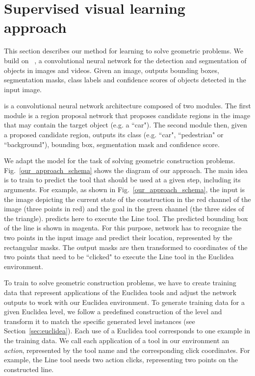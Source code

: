 \section{Supervised visual learning approach}
\label{mrcnn_section}
This section describes our method for learning to solve geometric problems.
We build on \maskrcnn~\cite{maskrcnn}, a convolutional neural network for the detection and segmentation of objects in images and videos. Given an image, \maskrcnn outputs bounding boxes, segmentation masks, class labels and confidence scores of objects detected in the input image. 

\maskrcnn is a convolutional neural network architecture composed of two modules. The first module is a region proposal network that proposes candidate regions in the image that may contain the target object (e.g. a ``car"). The second module then, given a proposed candidate region, outputs its class (e.g. ``car", ``pedestrian" or ``background"), bounding box, segmentation mask and confidence score.

We adapt the \maskrcnn model for the task of solving geometric construction problems.   
Fig.~\ref{our_approach_schema} shows the diagram of our approach.
The main idea is to train \maskrcnn to predict the tool that should be used at a given step, including its arguments.
For example, as shown in Fig.~\ref{our_approach_schema}, the input is the image depicting the current state of the construction in the red channel of the image (three points in red) and the goal in the green channel (the three sides of the triangle). \maskrcnn predicts here to execute the Line tool. The predicted bounding box of the line is shown in magenta. 
For this purpose, \maskrcnn network has to recognize the two
points in the input image and predict their location, represented by the rectangular masks.
The output masks are then transformed to coordinates of the two points that need to be ``clicked" to execute the Line tool in the Euclidea environment.
 
To train \maskrcnn to solve geometric construction problems, we have to create training data that represent applications of the Euclidea tools and adjust the network outputs to work with our Euclidea environment.
To generate training data for a given Euclidea level, we follow a predefined construction of the level and transform it to match the specific generated level instances (see Section~\ref{sec:euclidea}). Each use of a Euclidea tool corresponds to one example in the training data.
We call each application of a tool in our environment an \emph{action}, represented by the tool name and the corresponding click coordinates.
For example, the Line tool needs two action clicks, representing two points on the constructed line.

